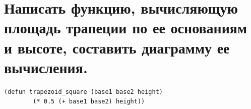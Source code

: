 \begin{figure}[H]
\end{figure}

\section{Написать функцию, вычисляющую площадь трапеции по ее основаниям и 	высоте, составить диаграмму ее вычисления.}

\begin{lstlisting}[caption=Дополнительное задание 2.]
	(defun trapezoid_square (base1 base2 height) 
		(* 0.5 (+ base1 base2) height))
\end{lstlisting}

\begin{figure}[H]
\end{figure}
